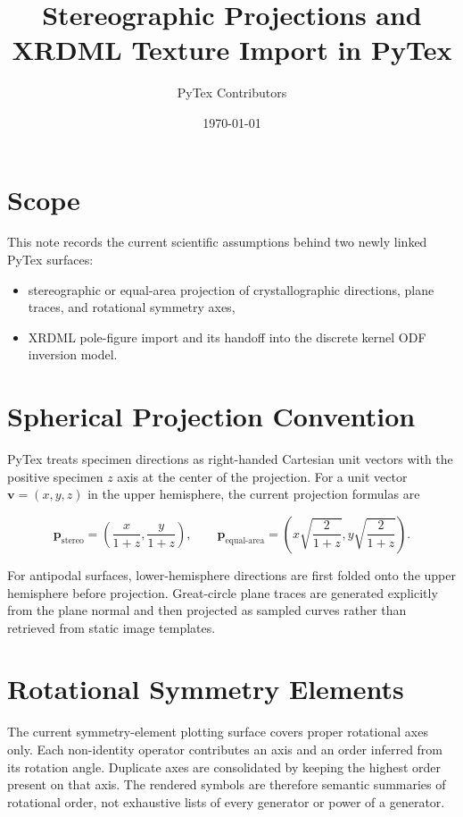 \documentclass[11pt]{article}
\title{Stereographic Projections and XRDML Texture Import in PyTex}
\author{PyTex Contributors}
\date{\today}
\begin{document}
\maketitle

\section{Scope}

This note records the current scientific assumptions behind two newly linked PyTex surfaces:

\begin{itemize}
  \item stereographic or equal-area projection of crystallographic directions, plane traces, and rotational symmetry axes,
  \item XRDML pole-figure import and its handoff into the discrete kernel ODF inversion model.
\end{itemize}

\section{Spherical Projection Convention}

PyTex treats specimen directions as right-handed Cartesian unit vectors with the positive specimen $z$ axis at the center of the projection. For a unit vector $\mathbf{v} = (x, y, z)$ in the upper hemisphere, the current projection formulas are

\[
  \mathbf{p}_{\text{stereo}} = \left(\frac{x}{1+z}, \frac{y}{1+z}\right),
  \qquad
  \mathbf{p}_{\text{equal-area}} = \left(x\sqrt{\frac{2}{1+z}}, y\sqrt{\frac{2}{1+z}}\right).
\]

For antipodal surfaces, lower-hemisphere directions are first folded onto the upper hemisphere before projection. Great-circle plane traces are generated explicitly from the plane normal and then projected as sampled curves rather than retrieved from static image templates.

\section{Rotational Symmetry Elements}

The current symmetry-element plotting surface covers proper rotational axes only. Each non-identity operator contributes an axis and an order inferred from its rotation angle. Duplicate axes are consolidated by keeping the highest order present on that axis. The rendered symbols are therefore semantic summaries of rotational order, not exhaustive lists of every generator or power of a generator.
\end{document}
